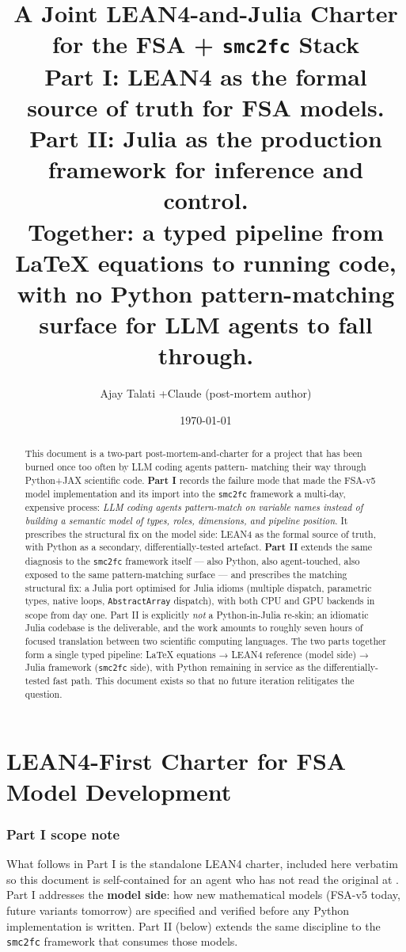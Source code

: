 \documentclass[11pt,a4paper]{article}
\title{A Joint LEAN4-and-Julia Charter\\
  for the FSA + \texttt{smc2fc} Stack\\
  \large Part I: LEAN4 as the formal source of truth for FSA models.\\
  Part II: Julia as the production framework for inference and control.\\
  Together: a typed pipeline from LaTeX equations to running code,\\
  with no Python pattern-matching surface for LLM agents to fall through.}
\author{Ajay Talati \quad+\quad Claude (post-mortem author)}
\date{\today}
\begin{document}
\maketitle

\begin{abstract}
This document is a two-part post-mortem-and-charter for a project
that has been burned once too often by LLM coding agents pattern-
matching their way through Python+JAX scientific code. \textbf{Part I}
records the failure mode that made the FSA-v5 model implementation
and its import into the \texttt{smc2fc} framework a multi-day,
expensive process: \emph{LLM coding agents pattern-match on variable
names instead of building a semantic model of types, roles,
dimensions, and pipeline position}. It prescribes the structural
fix on the model side: LEAN4 as the formal source of truth, with
Python as a secondary, differentially-tested artefact.
\textbf{Part II} extends the same diagnosis to the
\texttt{smc2fc} framework itself --- also Python, also
agent-touched, also exposed to the same pattern-matching surface
--- and prescribes the matching structural fix: a Julia port
optimised for Julia idioms (multiple dispatch, parametric types,
native loops, \texttt{AbstractArray} dispatch), with both CPU and
GPU backends in scope from day one. Part II is explicitly \emph{not}
a Python-in-Julia re-skin; an idiomatic Julia codebase is the
deliverable, and the work amounts to roughly seven hours of focused
translation between two scientific computing languages. The two
parts together form a single typed pipeline: LaTeX equations →
LEAN4 reference (model side) → Julia framework (\texttt{smc2fc}
side), with Python remaining in service as the differentially-tested
fast path. This document exists so that no future iteration
relitigates the question.
\end{abstract}

\tableofcontents

\newpage
\part{LEAN4-First Charter for FSA Model Development}
\label{part:lean4}

\section*{Part I scope note}

What follows in Part I is the standalone LEAN4 charter, included
here verbatim so this document is self-contained for an agent who
has not read the original at
. Part I
addresses the \textbf{model side}: how new mathematical models
(FSA-v5 today, future variants tomorrow) are specified and
verified before any Python implementation is written. Part II
(below) extends the same discipline to the \texttt{smc2fc}
framework that consumes those models.
\end{document}
